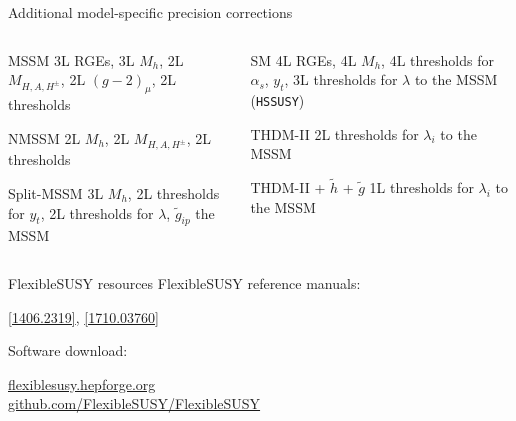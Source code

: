 \documentclass[hyperref={pdfpagelabels=false},ngerman]{beamer}
\newcommand{\as}{\alpha_s}
\begin{document}
\begin{frame}{Additional model-specific precision corrections}
  \begin{columns}[T]
    \begin{column}{0.49\textwidth}
      \begin{modelblock}{MSSM}
        3L RGEs, 3L $M_h$, 2L $M_{H,A,H^\pm}$, 2L $(g-2)_\mu$, 2L
        thresholds
      \end{modelblock}
      \begin{modelblock}{NMSSM}
        2L $M_h$, 2L $M_{H,A,H^\pm}$, 2L thresholds
      \end{modelblock}
      \begin{modelblock}{Split-MSSM}
        3L $M_h$, 2L thresholds for $y_t$, 2L thresholds for $\lambda$, $\tilde{g}_{ip}$
        the MSSM
      \end{modelblock}
    \end{column}
    \begin{column}{0.49\textwidth}
      \begin{modelblock}{SM}
        4L RGEs, 4L $M_h$, 4L thresholds for $\as$, $y_t$, 3L
        thresholds for $\lambda$ to the MSSM (\texttt{HSSUSY})
      \end{modelblock}
      \begin{modelblock}{THDM-II}
        2L thresholds for $\lambda_i$ to the MSSM
      \end{modelblock}
      \begin{modelblock}{THDM-II + $\tilde{h}$ + $\tilde{g}$}
        1L thresholds for $\lambda_i$ to the MSSM
      \end{modelblock}
    \end{column}
  \end{columns}
\end{frame}


\begin{frame}{FlexibleSUSY resources}
  FlexibleSUSY reference manuals:
  \begin{center}
    \href{https://arxiv.org/abs/1406.2319}{[1406.2319]},
    \href{https://arxiv.org/abs/1710.03760}{[1710.03760]}
  \end{center}
  Software download:
  \begin{center}
    \href{https://flexiblesusy.hepforge.org}{flexiblesusy.hepforge.org}\\[0.5em]
    \href{https://github.com/FlexibleSUSY/FlexibleSUSY}{github.com/FlexibleSUSY/FlexibleSUSY}
  \end{center}
\end{frame}
\end{document}
